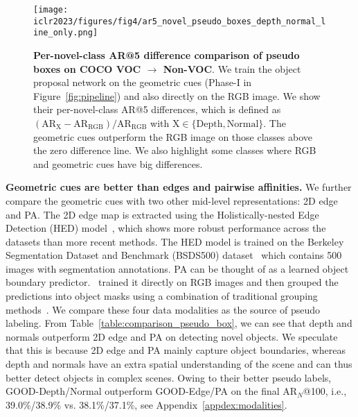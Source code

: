 \documentclass{article} \usepackage{iclr2023_conference,times}
\begin{document}
\begin{figure}[t]
    \centering
\texttt{[image: iclr2023/figures/fig4/ar5\_novel\_pseudo\_boxes\_depth\_normal\_line\_only.png]}
\caption{\textbf{Per-novel-class AR@5 difference comparison of pseudo boxes on COCO VOC $\rightarrow$ Non-VOC}. We train the object proposal network on the geometric cues (Phase-I in Figure~\ref{fig:pipeline}) and also directly on the RGB image. We show their per-novel-class AR@5 differences, which is defined as $(\text{AR}_{\text{X}}-\text{AR}_{\text{RGB}})/\text{AR}_{\text{RGB}}$ with $\text{X}\in\{\text{Depth},\text{Normal}\}$. The geometric cues outperform the RGB image on those classes above the zero difference line. We also highlight some classes where RGB and geometric cues have big differences.
    }
    \label{fig:depth_classwise}
\end{figure}





\textbf{Geometric cues are better than edges and pairwise affinities.}
We further compare the geometric cues with two other mid-level representations: 2D edge and PA. 
The 2D edge map is extracted using the Holistically-nested Edge Detection (HED) model~\citep{xie2015holistically}, which shows more robust performance across the datasets than more recent methods. The HED model is trained on the Berkeley Segmentation Dataset and Benchmark (BSDS500) dataset~\citep{amfm_pami2011} which contains 500 images with segmentation annotations. PA can be thought of as a learned object boundary predictor.~\citet{wang2022open} trained it directly on RGB images and then grouped the predictions into object masks using a combination of  traditional grouping methods~\citep{shi2000normalized, arbelaez2006UCM, MCG}. 
We compare these four data modalities as the source of pseudo labeling. 
From Table~\ref{table:comparison_pseudo_box}, we can see that depth and normals outperform 2D edge and PA on detecting novel objects. 
We speculate that this is because 2D edge and PA mainly capture object boundaries, whereas depth and normals have an extra spatial understanding of the scene and can thus better detect objects in complex scenes. 
Owing to their better pseudo labels, GOOD-Depth/Normal outperform GOOD-Edge/PA on the final AR$_N$@100, i.e., 39.0\%/38.9\% vs. 38.1\%/37.1\%, see Appendix~\ref{appdex:modalities}.
\end{document}
